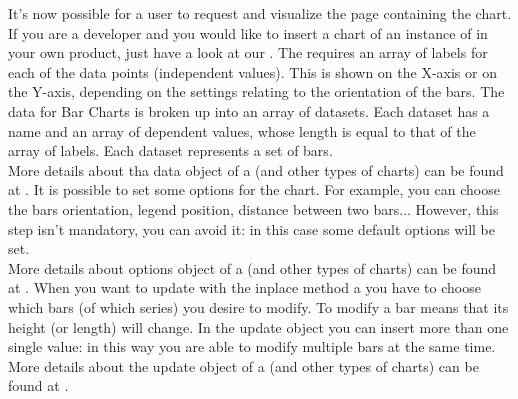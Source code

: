 		It's now possible for a user to request and visualize the page containing the chart.\\
		If you are a developer and you would like to insert a chart of an instance of  in your own product, just have a look at our .
			The  requires an array of labels for each of the data points (independent values). This is shown on the X-axis or on the Y-axis, depending on the settings relating to the orientation of the bars. The data for Bar Charts is broken up into an array of datasets. Each dataset has a name and an array of dependent values, whose length is equal to that of the array of labels. Each dataset represents a set of bars.\\
			More details about tha data object of a  (and other types of charts) can be found at .
			It is possible to set some options for the chart. For example, you can choose the bars orientation, legend position, distance between two bars... However, this step isn't mandatory, you can avoid it: in this case some default options will be set.\\
			More details about options object of a  (and other types of charts) can be found at .
			When you want to update with the inplace method a  you have to choose which bars (of which series) you desire to modify. To modify a bar means that its height (or length) will change. In the update object you can insert more than one single value: in this way you are able to modify multiple bars at the same time.\\
			More details about the update object of a  (and other types of charts) can be found at .